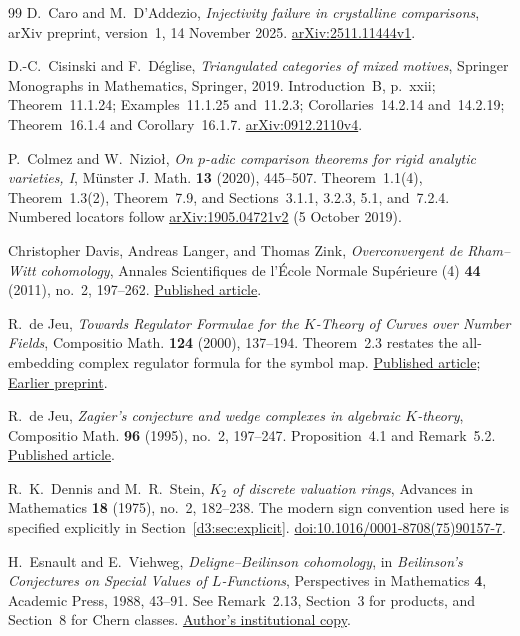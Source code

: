 \documentclass[11pt,a4paper]{amsart}
\numberwithin{equation}{section}
\theoremstyle{definition}
\theoremstyle{remark}
\begin{document}
\begin{thebibliography}{99}
D.~Caro and M.~D'Addezio,
\emph{Injectivity failure in crystalline comparisons},
arXiv preprint, version~1, 14 November 2025.
\href{https://arxiv.org/abs/2511.11444v1}{arXiv:2511.11444v1}.

D.-C.~Cisinski and F.~D\'eglise,
\emph{Triangulated categories of mixed motives},
Springer Monographs in Mathematics, Springer, 2019.
Introduction~B, p.~xxii; Theorem~11.1.24;
Examples~11.1.25 and~11.2.3; Corollaries~14.2.14 and~14.2.19;
Theorem~16.1.4 and Corollary~16.1.7.
\href{https://arxiv.org/abs/0912.2110v4}{arXiv:0912.2110v4}.

P.~Colmez and W.~Nizio\l, \emph{On $p$-adic comparison theorems for rigid analytic varieties, I},
M\"unster J. Math. \textbf{13} (2020), 445--507.
Theorem~1.1(4), Theorem~1.3(2), Theorem~7.9, and
Sections~3.1.1, 3.2.3, 5.1, and~7.2.4.
Numbered locators follow
\href{https://arxiv.org/abs/1905.04721v2}{arXiv:1905.04721v2}
(5 October 2019).

Christopher Davis, Andreas Langer, and Thomas Zink,
\emph{Overconvergent de Rham--Witt cohomology},
Annales Scientifiques de l'\'Ecole Normale Sup\'erieure (4)
\textbf{44} (2011), no.~2, 197--262.
\href{https://www.numdam.org/item/10.24033/asens.2143.pdf}{Published article}.

R.~de Jeu, \emph{Towards Regulator Formulae for the $K$-Theory of Curves over Number Fields}, Compositio Math. \textbf{124} (2000), 137--194. Theorem~2.3 restates the all-embedding complex regulator formula for the symbol map.
\href{https://doi.org/10.1023/A:1026440915009}{Published article};
\href{https://arxiv.org/abs/math/9811192}{Earlier preprint}.

R.~de Jeu, \emph{Zagier's conjecture and wedge complexes in algebraic $K$-theory}, Compositio Math. \textbf{96} (1995), no.~2, 197--247. Proposition~4.1 and Remark~5.2.
\href{https://www.numdam.org/article/CM_1995__96_2_197_0.pdf}{Published article}.

R.~K.~Dennis and M.~R.~Stein, \emph{$K_2$ of discrete valuation rings}, Advances in Mathematics \textbf{18} (1975), no.~2, 182--238. The modern sign convention used here is specified explicitly in Section~\ref{d3:sec:explicit}.
\href{https://doi.org/10.1016/0001-8708(75)90157-7}{doi:10.1016/0001-8708(75)90157-7}.

H.~Esnault and E.~Viehweg, \emph{Deligne--Beilinson cohomology}, in \emph{Beilinson's Conjectures on Special Values of $L$-Functions}, Perspectives in Mathematics \textbf{4}, Academic Press, 1988, 43--91. See Remark~2.13, Section~3 for products, and Section~8 for Chern classes.
\href{https://page.mi.fu-berlin.de/esnault/preprints/helene/13-deligne_beilinson.pdf}{Author's institutional copy}.


\end{thebibliography}
\end{document}
